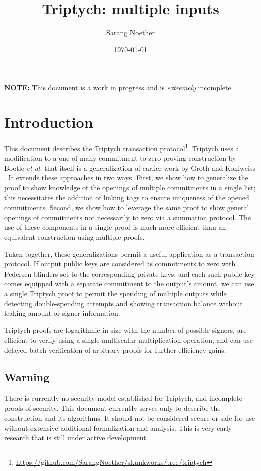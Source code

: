 \documentclass[draft]{article} %
\title{Triptych: multiple inputs}
\author{Sarang Noether}
\date{\today}
\begin{document}
\maketitle

\textbf{NOTE:} This document is a work in progress and is \textit{extremely} incomplete.


\section{Introduction}
This document describes the Triptych transaction protocol\footnote{\url{https://github.com/SarangNoether/skunkworks/tree/triptych}}.
Triptych uses a modification to a one-of-many commitment to zero proving construction by Bootle \textit{et al.} \cite{bootle} that itself is a generalization of earlier work by Groth and Kohlweiss \cite{groth}.
It extends these approaches in two ways.
First, we show how to generalize the proof to show knowledge of the openings of multiple commitments in a single list; this necessitates the addition of linking tags to ensure uniqueness of the opened commitments.
Second, we show how to leverage the same proof to show general openings of commitments not necessarily to zero via a summation protocol.
The use of these components in a single proof is much more efficient than an equivalent construction using multiple proofs.

Taken together, these generalizations permit a useful application as a transaction protocol.
If output public keys are considered as commitments to zero with Pedersen blinders set to the corresponding private keys, and each such public key comes equipped with a separate commitment to the output's amount, we can use a single Triptych proof to permit the spending of multiple outputs while detecting double-spending attempts and showing transaction balance without leaking amount or signer information.

Triptych proofs are logarithmic in size with the number of possible signers, are efficient to verify using a single multiscalar multiplication operation, and can use delayed batch verification of arbitrary proofs for further efficiency gains.

\subsection{Warning}
There is currently no security model established for Triptych, and incomplete proofs of security.
This document currently serves only to describe the construction and its algorithms.
It should not be considered secure or safe for use without extensive additional formalization and analysis.
This is very early research that is still under active development.
\end{document}

